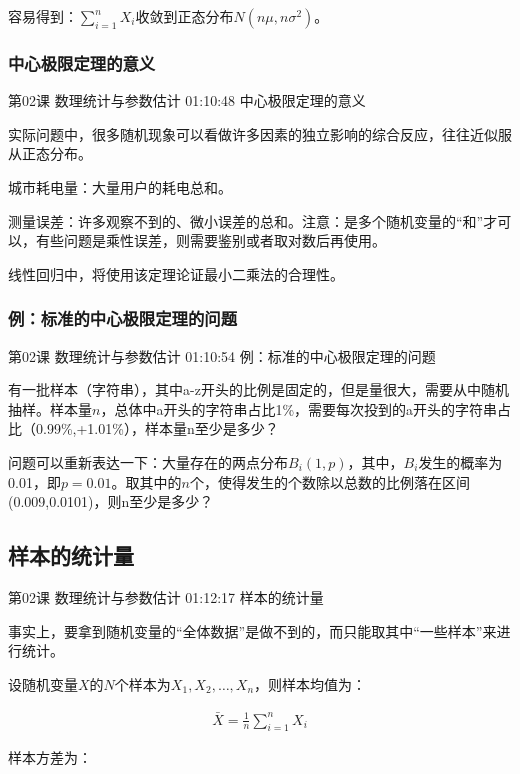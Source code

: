 \documentclass[UTF8]{ctexbook}
\begin{document}
容易得到：$\sum_{i=1}^{n}X_{i}$收敛到正态分布$N(n\mu,n\sigma^{2})$。

\subsubsection{中心极限定理的意义}

第02课 数理统计与参数估计 01:10:48 中心极限定理的意义

实际问题中，很多随机现象可以看做许多因素的独立影响的综合反应，往往近似服从正态分布。

城市耗电量：大量用户的耗电总和。

测量误差：许多观察不到的、微小误差的总和。注意：是多个随机变量的“和”才可以，有些问题是乘性误差，则需要鉴别或者取对数后再使用。

线性回归中，将使用该定理论证最小二乘法的合理性。

\subsubsection{例：标准的中心极限定理的问题}

第02课 数理统计与参数估计 01:10:54 例：标准的中心极限定理的问题

有一批样本（字符串），其中a-z开头的比例是固定的，但是量很大，需要从中随机抽样。样本量$n$，总体中a开头的字符串占比1\%，需要每次投到的a开头的字符串占比（0.99\%,+1.01\%），样本量n至少是多少？

问题可以重新表达一下：大量存在的两点分布$B_{i}(1,p)$，其中，$B_{i}$发生的概率为0.01，即$p=0.01$。取其中的$n$个，使得发生的个数除以总数的比例落在区间(0.009,0.0101)，则n至少是多少？

\subsection{样本的统计量}

第02课 数理统计与参数估计 01:12:17 样本的统计量

事实上，要拿到随机变量的“全体数据”是做不到的，而只能取其中“一些样本”来进行统计。

设随机变量$X$的$N$个样本为$X_{1},X_{2},\dots,X_{n}$，则样本均值为：

\begin{equation}
\begin{aligned}
\bar{X}=\frac{1}{n}\sum_{i=1}^{n}X_{i}
\end{aligned}
\end{equation}

样本方差为：
\end{document}
